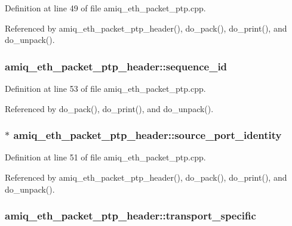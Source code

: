 Definition at line 49 of file amiq\_\-eth\_\-packet\_\-ptp.cpp.

Referenced by amiq\_\-eth\_\-packet\_\-ptp\_\-header(), do\_\-pack(), do\_\-print(), and do\_\-unpack().\hypertarget{classamiq__eth__packet__ptp__header_a7a93c17fb2f7e9d104b8456678cb6085}{
\subsubsection[{sequence\_\-id}]{ {\bf amiq\_\-eth\_\-packet\_\-ptp\_\-header::sequence\_\-id}}}
\label{classamiq__eth__packet__ptp__header_a7a93c17fb2f7e9d104b8456678cb6085}


Definition at line 53 of file amiq\_\-eth\_\-packet\_\-ptp.cpp.

Referenced by do\_\-pack(), do\_\-print(), and do\_\-unpack().\hypertarget{classamiq__eth__packet__ptp__header_aa66d99d4acc74866ed54741a0dff543e}{
\subsubsection[{source\_\-port\_\-identity}]{$\ast$ {\bf amiq\_\-eth\_\-packet\_\-ptp\_\-header::source\_\-port\_\-identity}}}
\label{classamiq__eth__packet__ptp__header_aa66d99d4acc74866ed54741a0dff543e}


Definition at line 51 of file amiq\_\-eth\_\-packet\_\-ptp.cpp.

Referenced by amiq\_\-eth\_\-packet\_\-ptp\_\-header(), do\_\-pack(), do\_\-print(), and do\_\-unpack().\hypertarget{classamiq__eth__packet__ptp__header_a3ed673b4781a4400bf3fa0c65a0cb6d7}{
\subsubsection[{transport\_\-specific}]{ {\bf amiq\_\-eth\_\-packet\_\-ptp\_\-header::transport\_\-specific}}}
\label{classamiq__eth__packet__ptp__header_a3ed673b4781a4400bf3fa0c65a0cb6d7}


